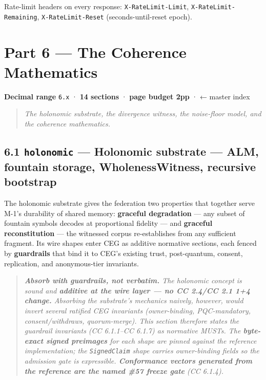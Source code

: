 \documentclass[11pt]{article}
\begin{document}
Rate-limit headers on every response: \texttt{X-RateLimit-Limit}, \texttt{X-RateLimit-Remaining}, \texttt{X-RateLimit-Reset} (seconds-until-reset epoch).


\clearpage
\section*{Part 6 — The Coherence Mathematics}


\textbf{Decimal range} \texttt{6.x} · \textbf{14 sections} · \textbf{page budget 2pp} · ← master index


\begin{quote}\itshape The holonomic substrate, the divergence witness, the noise-floor model, and the coherence mathematics.\end{quote}



\subsection*{6.1 \texttt{holonomic} — Holonomic substrate — ALM, fountain storage, WholenessWitness, recursive bootstrap}


The holonomic substrate gives the federation two properties that together serve M-1's durability of shared memory: \textbf{graceful degradation} — any subset of fountain symbols decodes at proportional fidelity — and \textbf{graceful reconstitution} — the witnessed corpus re-establishes from any sufficient fragment. Its wire shapes enter CEG as additive normative sections, each fenced by \textbf{guardrails} that bind it to CEG's existing trust, post-quantum, consent, replication, and anonymous-tier invariants.


\begin{quote}\itshape \textbf{Absorb with guardrails, not verbatim.} The holonomic concept is sound and \textbf{additive at the wire layer — no CC 2.4/CC 2.1 1+4 change.} Absorbing the substrate's mechanics naively, however, would invert several ratified CEG invariants (owner-binding, PQC-mandatory, consent/withdraws, quorum-merge). This section therefore states the guardrail invariants (CC 6.1.1–CC 6.1.7) as normative MUSTs. The \textbf{byte-exact signed preimages} for each shape are pinned against the reference implementation; the \texttt{SignedClaim} shape carries owner-binding fields so the admission gate is expressible. \textbf{Conformance vectors generated from the reference are the named \#57 freeze gate} (CC 6.1.4).\end{quote}
\end{document}
